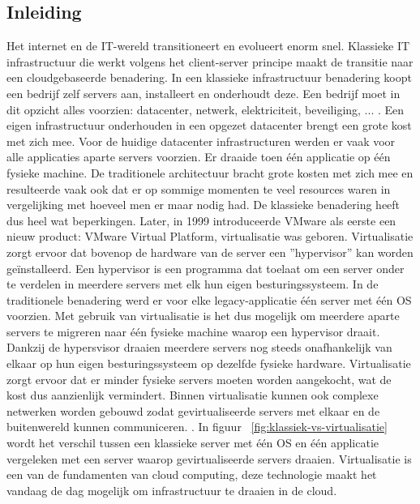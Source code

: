 \subsection{Inleiding}
Het internet en de IT-wereld transitioneert en evolueert enorm snel. Klassieke IT infrastructuur die werkt volgens het client-server principe maakt de transitie naar een cloudgebaseerde benadering. In een klassieke infrastructuur benadering koopt een bedrijf zelf servers aan, installeert en onderhoudt deze. Een bedrijf moet in dit opzicht alles voorzien: datacenter, netwerk, elektriciteit, beveiliging, ... . Een eigen infrastructuur onderhouden in een opgezet datacenter brengt een grote kost met zich mee. Voor de huidige datacenter infrastructuren werden er vaak voor alle applicaties aparte servers voorzien. Er draaide toen één applicatie op één fysieke machine. De traditionele architectuur bracht grote kosten met zich mee en resulteerde vaak ook dat er op sommige momenten te veel resources waren in vergelijking met hoeveel men er maar nodig had. De klassieke benadering heeft dus heel wat beperkingen. 
\newline
\newline
Later, in 1999 introduceerde VMware als eerste een nieuw product: VMware Virtual Platform, virtualisatie was geboren. Virtualisatie zorgt ervoor dat bovenop de hardware van de server een ''hypervisor'' kan worden geïnstalleerd. Een hypervisor is een programma dat toelaat om een server onder te verdelen in meerdere servers met elk hun eigen besturingssysteem. In de traditionele benadering werd er voor elke legacy-applicatie één server met één OS voorzien. Met gebruik van virtualisatie is het dus mogelijk om meerdere aparte servers te migreren naar één fysieke machine waarop een hypervisor draait. Dankzij de hypersvisor draaien meerdere servers nog steeds onafhankelijk van elkaar op hun eigen besturingssysteem op dezelfde fysieke hardware. Virtualisatie zorgt ervoor dat er minder fysieke servers  moeten worden aangekocht, wat de kost dus aanzienlijk vermindert. Binnen virtualisatie kunnen ook complexe netwerken worden gebouwd zodat gevirtualiseerde servers met elkaar en de buitenwereld kunnen communiceren. \autocite{RedHat2019}. In 
figuur ~\ref{fig:klassiek-vs-virtualisatie} wordt het verschil tussen een klassieke server met één OS en één applicatie vergeleken met een server waarop gevirtualiseerde servers draaien. Virtualisatie is een van de fundamenten van cloud computing, deze technologie maakt het vandaag de dag mogelijk om infrastructuur te draaien in de cloud.
\newline
